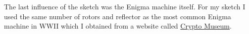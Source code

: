\documentclass[12pt,a4paper]{article}
\begin{document}
		\begin{center}
			\\
			\vspace{0.5cm}
			\\
		\end{center}
		\vspace{0.5cm}
		The last influence of the sketch was the Enigma machine itself. For my sketch I used the same 
		number of rotors and reflector as the most common Enigma machine in WWII which I obtained from 
		a website called \href{https://www.cryptomuseum.com/crypto/enigma/wiring.htm}{Crypto Museum}.
\end{document}
